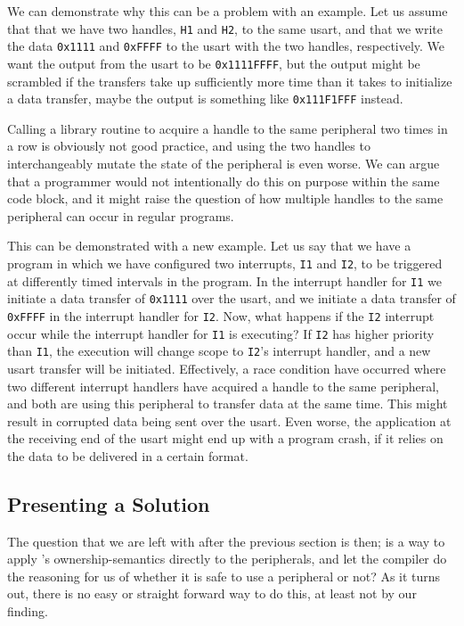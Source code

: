 We can demonstrate why this can be a problem with an example.
Let us assume that that we have two handles, \texttt{H1} and \texttt{H2}, to the same \gls{usart}, and that we write the data \texttt{0x1111} and \texttt{0xFFFF} to the \gls{usart} with the two handles, respectively.
We want the output from the \gls{usart} to be \texttt{0x1111FFFF}, but the output might be scrambled if the transfers take up sufficiently more time than it takes to initialize a data transfer, maybe the output is something like \texttt{0x111F1FFF} instead.

Calling a library routine to acquire a handle to the same peripheral two times in a row is obviously not good practice, and using the two handles to interchangeably mutate the state of the peripheral is even worse.
We can argue that a programmer would not intentionally do this on purpose within the same code block, and it might raise the question of how multiple handles to the same peripheral can occur in regular programs.

This can be demonstrated with a new example.
Let us say that we have a program in which we have configured two interrupts, \texttt{I1} and \texttt{I2}, to be triggered at differently timed intervals in the program.
In the interrupt handler for \texttt{I1} we initiate a data transfer of \texttt{0x1111} over the \gls{usart}, and we initiate a data transfer of \texttt{0xFFFF} in the interrupt handler for \texttt{I2}.
Now, what happens if the \texttt{I2} interrupt occur while the interrupt handler for \texttt{I1} is executing?
If \texttt{I2} has higher priority than \texttt{I1}, the execution will change scope to \texttt{I2}'s interrupt handler, and a new \gls{usart} transfer will be initiated.
Effectively, a race condition have occurred where two different interrupt handlers have acquired a handle to the same peripheral, and both are using this peripheral to transfer data at the same time.
This might result in corrupted data being sent over the \gls{usart}.
Even worse, the application at the receiving end of the \gls{usart} might end up with a program crash, if it relies on the data to be delivered in a certain format.

\subsection{Presenting a Solution}
The question that we are left with after the previous section is then; is a way to apply {\rust}'s ownership-semantics directly to the peripherals, and let the {\rust} compiler do the reasoning for us of whether it is safe to use a peripheral or not?
As it turns out, there is no easy or straight forward way to do this, at least not by our finding.

